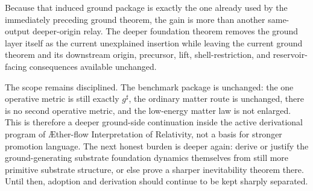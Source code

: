 \documentclass[11pt]{article}
\newcommand{\Aflow}{\AE{}ther-flow}
\newcommand{\TheoryName}{\Aflow{} Interpretation of Relativity}
\newcommand{\CompletedMetric}{g^{\sharp}}
\begin{document}
Because that induced ground package is exactly the one already used by the immediately preceding ground theorem, the gain is more than another same-output deeper-origin relay. The deeper foundation theorem removes the ground layer itself as the current unexplained insertion while leaving the current ground theorem and its downstream origin, precursor, lift, shell-restriction, and reservoir-facing consequences available unchanged.

The scope remains disciplined. The benchmark package is unchanged: the one operative metric is still exactly \(\CompletedMetric\), the ordinary matter route is unchanged, there is no second operative metric, and the low-energy matter law is not enlarged. This is therefore a deeper ground-side continuation inside the active derivational program of \TheoryName{}, not a basis for stronger promotion language. The next honest burden is deeper again: derive or justify the ground-generating substrate foundation dynamics themselves from still more primitive substrate structure, or else prove a sharper inevitability theorem there. Until then, adoption and derivation should continue to be kept sharply separated.
\end{document}
